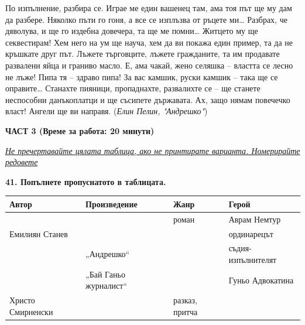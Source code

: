 \documentclass[12pt,a4paper]{article}
\renewcommand{\arraystretch}{1.2}
\begin{document}
\indent По изпълнение, разбира се. Играе ме един вашенец там, ама тоя път ще му дам да разбере. Няколко пъти го гоня, а все се изплъзва от ръцете ми\dots{} Разбрах, че дяволува, и ще го издебна довечера, та ще ме помни\dots{} Житцето му ще секвестирам! Хем него на ум ще науча, хем да ви покажа един пример, та да не кръшкате друг път. Лъжете търговците, лъжете гражданите, та им продавате развалени яйца и граниво масло. Е, ама чакай, жено селяшка -- властта се лесно не лъже! Пипа тя -- здраво пипа! За вас камшик, руски камшик -- така ще се оправите\dots{} Станахте пияници, пропаднахте, развалихте се -- ще станете неспособни данъкоплатци и ще съсипете държавата. Ах, защо нямам повечечко власт! Ангели ще ви направя. (\textit{Елин Пелин, "Андрешко"})

\newpage

\noindent
\textbf{ЧАСТ 3 (Време за работа: 20 минути)}

\vspace{0.3cm}

\noindent
\underline{\textit{Не пречертавайте цялата таблица, ако не принтирате варианта. Номерирайте редовете}}

\vspace{0.6cm}

\noindent
\textbf{41. Попълнете пропуснатото в таблицата.}

\vspace{0.3cm}

\noindent
\renewcommand{\arraystretch}{1.8}
\begin{tabularx}{\textwidth}{|>{\raggedright\arraybackslash}X|>{\raggedright\arraybackslash}X|>{\raggedright\arraybackslash}X|>{\raggedright\arraybackslash}X|}
\hline
\hfil\bfseries Автор & \hfil\bfseries Произведение & \hfil\bfseries Жанр & \hfil\bfseries Герой \\ \hline
 &  & роман & Аврам Немтур \\ \hline
Емилиян Станев &  &  & ординарецът \\ \hline
 & „Андрешко“ &  & съдия-изпълнителят \\ \hline
 & „Бай Ганьо журналист“ &  & Гуньо Адвокатина \\ \hline
Христо Смирненски &  & разказ, притча &  \\ \hline
\end{tabularx}

\vspace{0.3cm}
\end{document}
